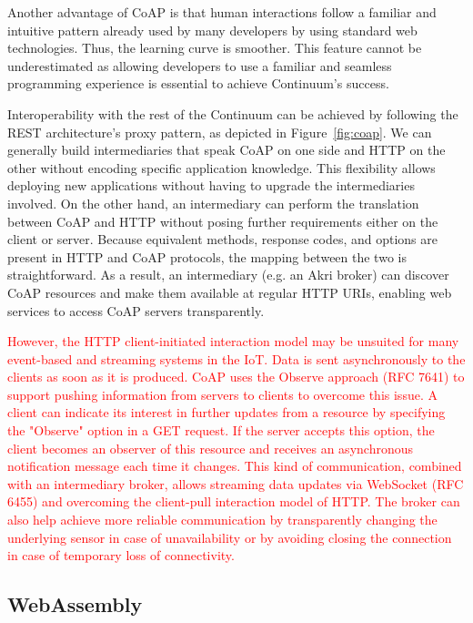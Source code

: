 Another advantage of CoAP is that human interactions follow a familiar and intuitive pattern already used by many developers by using standard web technologies. Thus, the learning curve is smoother. This feature cannot be underestimated as allowing developers to use a familiar and seamless programming experience is essential to achieve Continuum's success.

Interoperability with the rest of the Continuum can be achieved by following the REST architecture's proxy pattern, as depicted in Figure~\ref{fig:coap}. We can generally build intermediaries that speak CoAP on one side and HTTP on the other without encoding specific application knowledge. This flexibility allows deploying new applications without having to upgrade the intermediaries involved. On the other hand, an intermediary can perform the translation between CoAP and HTTP without posing further requirements either on the client or server. Because equivalent methods, response codes, and options are present in HTTP and CoAP protocols, the mapping between the two is straightforward. As a result, an intermediary (e.g. an Akri broker) can discover CoAP resources and make them available at regular HTTP URIs, enabling web services to access CoAP servers transparently.

\textcolor{red}{However, the HTTP client-initiated interaction model may be unsuited for many event-based and streaming systems in the IoT. Data is sent asynchronously to the clients as soon as it is produced. CoAP uses the Observe approach (RFC 7641) to support pushing information from servers to clients to overcome this issue. A client can indicate its interest in further updates from a resource by specifying the "Observe" option in a GET request. If the server accepts this option, the client becomes an observer of this resource and receives an asynchronous notification message each time it changes. This kind of communication, combined with an intermediary broker, allows streaming data updates via WebSocket (RFC 6455) and overcoming the client-pull interaction model of HTTP. The broker can also help achieve more reliable communication by transparently changing the underlying sensor in case of unavailability or by avoiding closing the connection in case of temporary loss of connectivity.}

\subsection{WebAssembly}
\label{sec:webassembly}

